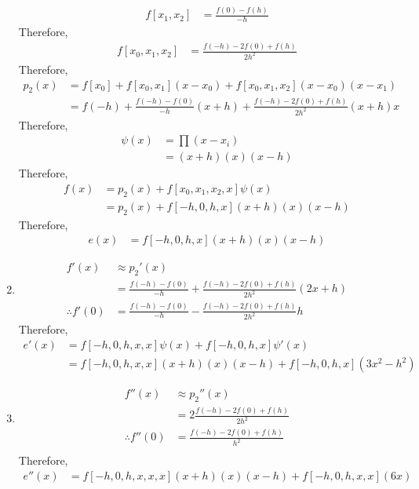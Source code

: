 \documentclass[fleqn, a4paper, 11pt, oneside, reqno]{amsart}
\theoremstyle{definition}
\theoremstyle{theorem}
\begin{document}
\begin{solution}
\begin{enumerate}[leftmargin=*]
\begin{align*}
				f[x_1,x_2] & = \frac{f(0) - f(h)}{-h}
			\end{align*}
			Therefore,
			\begin{align*}
				f[x_0,x_1,x_2] & = \frac{f(-h) - 2 f(0) + f(h)}{2 h^2}
			\end{align*}
			Therefore,
			\begin{align*}
				p_2(x) & = f[x_0] + f[x_0,x_1] (x - x_0) + f[x_0,x_1,x_2] (x - x_0) (x - x_1) \\
                                       & = f(-h) + \frac{f(-h) - f(0)}{-h} (x + h) + \frac{f(-h) - 2 f(0) + f(h)}{2 h^2} (x + h) x
			\end{align*}
			Therefore,
			\begin{align*}
				\psi(x) & = \prod (x - x_i) \\
                                        & = (x + h) (x) (x - h)
			\end{align*}
			Therefore,
			\begin{align*}
				f(x) & = p_2(x) + f[x_0,x_1,x_2,x] \psi(x) \\
                                     & = p_2(x) + f[-h,0,h,x] (x + h) (x) (x - h)
			\end{align*}
			Therefore,
			\begin{align*}
				e(x) & = f[-h,0,h,x] (x + h) (x) (x - h)
			\end{align*}
		\item
			\begin{align*}
				f'(x)            & \approx {p_2}'(x)                                                         \\
                                                 & = \frac{f(-h) - f(0)}{-h} + \frac{f(-h) - 2 f(0) + f(h)}{2 h^2} (2 x + h) \\
				\therefore f'(0) & = \frac{f(-h) - f(0)}{-h} - \frac{f(-h) - 2 f(0) + f(h)}{2 h^2} h
			\end{align*}
			Therefore,
			\begin{align*}
				e'(x) & = f[-h,0,h,x,x] \psi(x) + f[-h,0,h,x] \psi'(x) \\
                                      & = f[-h,0,h,x,x] (x + h) (x) (x - h) + f[-h,0,h,x] \left( 3 x^2 - h^2 \right)
			\end{align*}
		\item
			\begin{align*}
				f''(x)            & \approx {p_2}''(x)                      \\
                                                  & = 2 \frac{f(-h) - 2 f(0) + f(h)}{2 h^2} \\
				\therefore f''(0) & = \frac{f(-h) - 2 f(0) + f(h)}{h^2}     \\
			\end{align*}
			Therefore,
			\begin{align*}
				e''(x) & = f[-h,0,h,x,x,x] (x + h) (x) (x - h) + f[-h,0,h,x,x] (6 x)
			\end{align*}
	\end{enumerate}
\end{solution}
\end{document}
